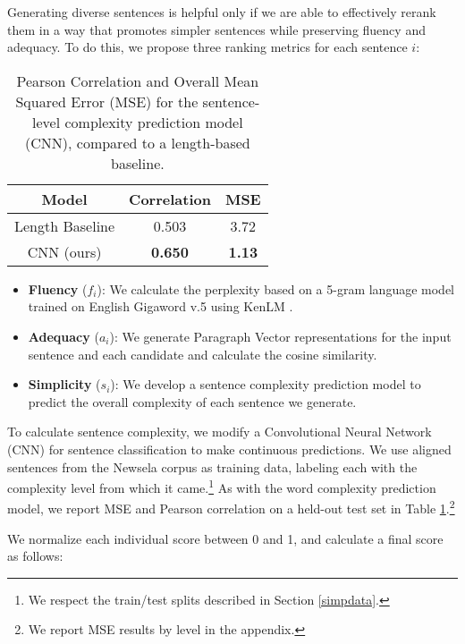 \documentclass[11pt,a4paper]{article}
\begin{document}
Generating diverse sentences is helpful only if we are able to effectively rerank them in a way that promotes simpler sentences while preserving fluency and adequacy. To do this, we propose three ranking metrics for each sentence $i$:

\begin{table}
\begin{center}
\begin{tabular}{|c|c|c|} \hline
\textbf{Model} & \textbf{Correlation} & \textbf{MSE} \\ \hline
Length Baseline & 0.503 & 3.72 \\
CNN (ours) & \textbf{0.650} & \textbf{1.13} \\ \hline
\end{tabular}
\end{center}
\caption{\label{sent-comp-table} Pearson Correlation and Overall Mean Squared Error (MSE) for the sentence-level complexity prediction model (CNN), compared to a length-based baseline.}
\end{table}

\begin{itemize}
    \item \textbf{Fluency} ($f_i$): We calculate the perplexity based on a 5-gram language model trained on English Gigaword v.5 \cite{parker2011english} using KenLM \cite{heafield2011kenlm}.
    \item \textbf{Adequacy} ($a_i$): We generate Paragraph Vector representations \cite{le2014distributed} for the input sentence and each candidate and calculate the cosine similarity.
    \item \textbf{Simplicity} ($s_i$): We develop a sentence complexity prediction model to predict the overall complexity of each sentence we generate.
\end{itemize}

To calculate sentence complexity, we modify a Convolutional Neural Network (CNN) for sentence classification \cite{kim2014convolutional} to make continuous predictions. We use aligned sentences from the Newsela corpus \cite{xu2015problems} as training data, labeling each with the complexity level from which it came.\footnote{We respect the train/test splits described in Section \ref{simpdata}.} As with the word complexity prediction model, we report MSE and Pearson correlation on a held-out test set in Table \ref{sent-comp-table}.\footnote{We report MSE results by level in the appendix.}

We normalize each individual score between 0 and 1, and calculate a final score as follows:
\end{document}
